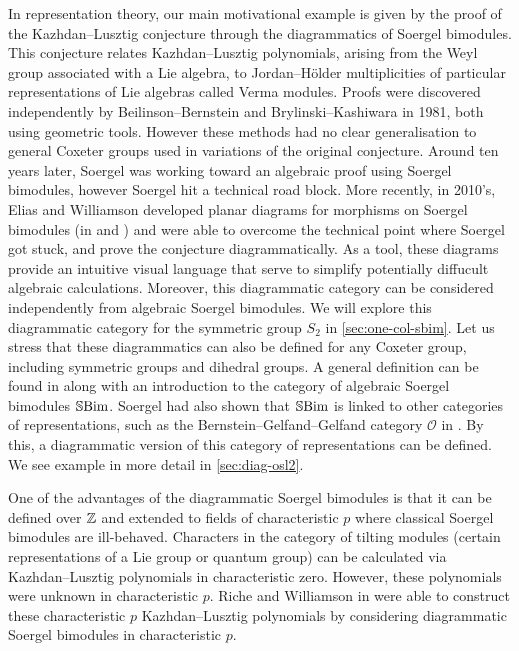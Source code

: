 In representation theory, our main motivational example is given by the proof of the Kazhdan--Lusztig conjecture through the diagrammatics of Soergel bimodules. This conjecture relates Kazhdan--Lusztig polynomials, arising from the Weyl group associated with a Lie algebra, to Jordan--H\"older multiplicities of particular representations of Lie algebras called Verma modules. Proofs were discovered independently by Beilinson--Bernstein and Brylinski--Kashiwara in 1981, both using geometric tools. However these methods had no clear generalisation to general Coxeter groups used in variations of the original conjecture. Around ten years later, Soergel was working toward an algebraic proof using Soergel bimodules, however Soergel hit a technical road block. More recently, in 2010's, Elias and Williamson developed planar diagrams for morphisms on Soergel bimodules (in \cite{hodge-theory-of-soergel-bimodules} and \cite{diagrammatics-for-soergel-categories}) and were able to overcome the technical point where Soergel got stuck, and prove the conjecture diagrammatically. As a tool, these diagrams provide an intuitive visual language that serve to simplify potentially diffucult algebraic calculations. Moreover, this diagrammatic category can be considered independently from algebraic Soergel bimodules. We will explore this diagrammatic category for the symmetric group $S_2$ in \autoref{sec:one-col-sbim}. Let us stress that these diagrammatics can also be defined for any Coxeter group, including symmetric groups and dihedral groups. A general definition can be found in \cite{intro-soergel-bimodules} along with an introduction to the category of algebraic Soergel bimodules $\operatorname{\mathbb{S}Bim}$. Soergel had also shown that $\operatorname{\mathbb{S}Bim}$ is linked to other categories of representations, such as the Bernstein--Gelfand--Gelfand category $\mathcal{O}$ in \cite{soergel-category-O}. By this, a diagrammatic version of this category of representations can be defined. We see example in more detail in \autoref{sec:diag-osl2}.

One of the advantages of the diagrammatic Soergel bimodules is that it can be defined over $\mathbb{Z}$ and extended to fields of characteristic $p$ where classical Soergel bimodules are ill-behaved. Characters in the category of tilting modules (certain representations of a Lie group or quantum group) can be calculated via Kazhdan--Lusztig polynomials in characteristic zero. However, these polynomials were unknown in characteristic $p$. Riche and Williamson in \cite{riche-williamson-tilt-modules-p-canon-basis} were able to construct these characteristic $p$ Kazhdan--Lusztig polynomials by considering diagrammatic Soergel bimodules in characteristic $p$.


